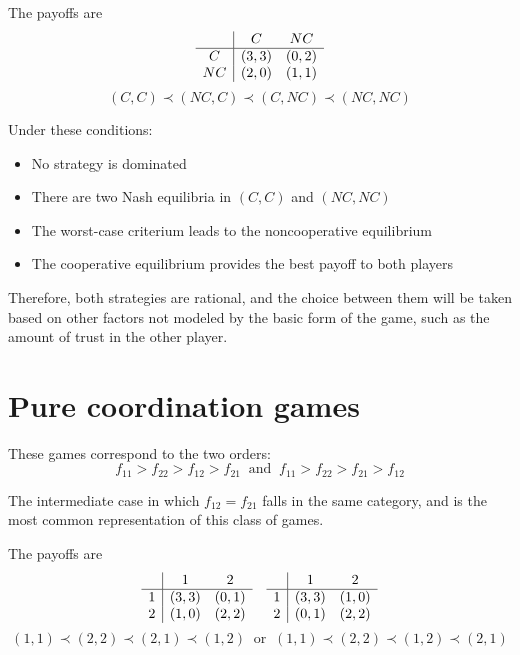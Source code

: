 The payoffs are
$$
\begin{array}{c | c c}
	& C & NC \\
	\hline
	C & (3,3) & (0, 2) \\
	NC & (2,0) & (1,1)
\end{array}
$$
$$ (C, C) \prec (NC, C) \prec (C, NC) \prec (NC, NC) $$

Under these conditions: 
\begin{itemize}
	\item No strategy is dominated
	
	\item There are two Nash equilibria in $(C,C)$ and $(NC, NC)$
	
	\item The worst-case criterium leads to the noncooperative equilibrium
	
	\item The cooperative equilibrium provides the best payoff to both players
\end{itemize}

Therefore, both strategies are rational, and the choice between them will be taken based on other factors not modeled by the basic form of the game, such as the amount of trust in the other player.

\section{Pure coordination games}

These games correspond to the two orders:
$$ f_{11} > f_{22} > f_{12} > f_{21} \ \text{ and } \ f_{11} > f_{22} > f_{21} > f_{12} $$

The intermediate case in which $f_{12} = f_{21}$ falls in the same category, and is the most common representation of this class of games.

The payoffs are
$$
\begin{array}{c | c c}
	& 1& 2 \\
	\hline
	1 & (3,3) & (0, 1) \\
	2 & (1,0) & (2,2)
\end{array}
\quad
\begin{array}{c | c c}
	& 1& 2 \\
	\hline
	1 & (3,3) & (1, 0) \\
	2 & (0,1) & (2,2)
\end{array}
$$
$$ (1, 1) \prec (2, 2) \prec (2, 1) \prec (1, 2) \ \text{ or } \ (1, 1) \prec (2, 2) \prec (1, 2) \prec (2, 1)  $$

